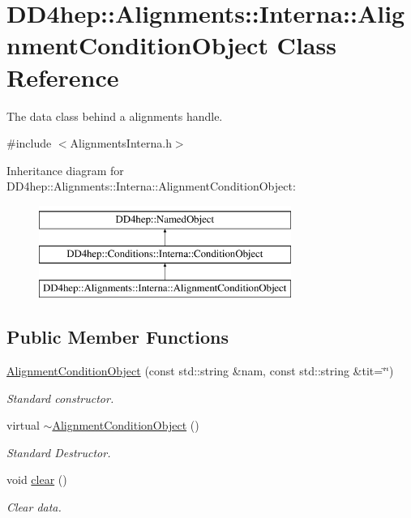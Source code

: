\hypertarget{class_d_d4hep_1_1_alignments_1_1_interna_1_1_alignment_condition_object}{}\section{D\+D4hep\+:\+:Alignments\+:\+:Interna\+:\+:Alignment\+Condition\+Object Class Reference}
\label{class_d_d4hep_1_1_alignments_1_1_interna_1_1_alignment_condition_object}


The data class behind a alignments handle.  




{\ttfamily \#include $<$Alignments\+Interna.\+h$>$}

Inheritance diagram for D\+D4hep\+:\+:Alignments\+:\+:Interna\+:\+:Alignment\+Condition\+Object\+:\begin{figure}[H]
\begin{center}
\leavevmode
\includegraphics[height=3.000000cm]{class_d_d4hep_1_1_alignments_1_1_interna_1_1_alignment_condition_object}
\end{center}
\end{figure}
\subsection*{Public Member Functions}
\begin{DoxyCompactItemize}
\item 
\hyperlink{class_d_d4hep_1_1_alignments_1_1_interna_1_1_alignment_condition_object_a7ce9315ac6a45cf8de0bc38f0c8d0e9d}{Alignment\+Condition\+Object} (const std\+::string \&nam, const std\+::string \&tit=\char`\"{}\char`\"{})
\begin{DoxyCompactList}\small\item\em Standard constructor. \end{DoxyCompactList}\item 
virtual \hyperlink{class_d_d4hep_1_1_alignments_1_1_interna_1_1_alignment_condition_object_abbec903201eccc7d7ff725c6b573aaa7}{$\sim$\+Alignment\+Condition\+Object} ()
\begin{DoxyCompactList}\small\item\em Standard Destructor. \end{DoxyCompactList}\item 
void \hyperlink{class_d_d4hep_1_1_alignments_1_1_interna_1_1_alignment_condition_object_a8290f82fe5e45264993a475a7f532518}{clear} ()
\begin{DoxyCompactList}\small\item\em Clear data. \end{DoxyCompactList}\end{DoxyCompactItemize}

